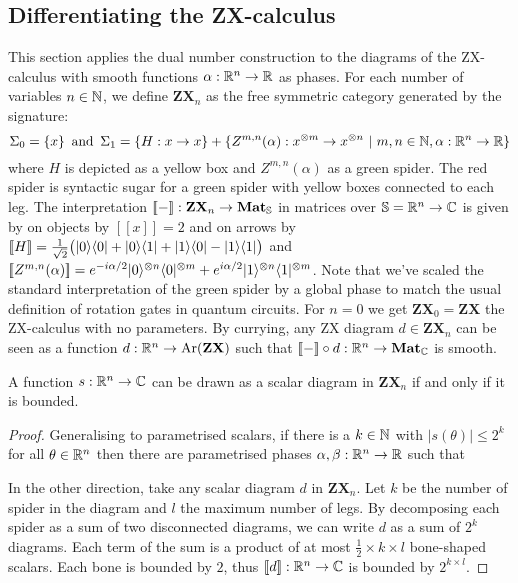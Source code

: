 \subsection{Differentiating the ZX-calculus}\label{2b-differentiating-zx}

This section applies the dual number construction to the diagrams of the ZX-calculus with smooth functions $\alpha : \R^n \to \R$ as phases.
For each number of variables $n \in \N$, we define $\mathbf{ZX}_n$ as the free symmetric category generated by the signature:
$$\Sigma_0 = \{ x \} \s \text{and} \s \Sigma_1 = \{ H : x \to x \} + \{ Z^{m, n}(\alpha) : x^{\otimes m} \to x^{\otimes n} \ \vert \ m, n \in \N, \alpha : \R^n \to \R \}$$
where $H$ is depicted as a yellow box and $Z^{m, n}(\alpha)$ as a green spider.
The red spider is syntactic sugar for a green spider with yellow boxes connected to each leg.
The interpretation $[\![-]\!]  : \mathbf{ZX}_n \to \mathbf{Mat}_\S$ in matrices over $\S = \R^n \to \C$ is given by on objects by $[\![ x ]\!] = 2$ and on arrows by
$[\![ H ]\!] = \frac{1}{\sqrt{2}} \big(\ket{0}\bra{0} + \ket{0}\bra{1} + \ket{1}\bra{0} - \ket{1}\bra{1}\big)$
and $[\![Z^{m, n}(\alpha)]\!] =
e^{-i \alpha / 2} \ket{0}^{\otimes n} \bra{0}^{\otimes m}
+ e^{i \alpha / 2} \ket{1}^{\otimes n} \bra{1}^{\otimes m}$.
Note that we've scaled the standard interpretation of the green spider by a global phase to match the usual definition of rotation gates in quantum circuits.
For $n = 0$ we get $\mathbf{ZX}_0 = \mathbf{ZX}$ the ZX-calculus with no parameters.
By currying, any ZX diagram $d \in \mathbf{ZX}_n$ can be seen as a function $d : \R^n \to \text{Ar}(\mathbf{ZX})$ such that $[\![-]\!] \circ d : \R^n \to \mathbf{Mat}_\C$ is smooth.

\begin{lemma}\label{lemma-scalars}
A function $s : \R^n \to \C$ can be drawn as a scalar diagram in $\mathbf{ZX}_n$ if and only if it is bounded.
\end{lemma}

\begin{proof}
Generalising \cite[P.~8.101]{CoeckeKissinger17} to parametrised scalars, if there is a $k \in \N$ with $\vert s(\theta) \vert \leq 2^k$ for all $\theta \in \R^n$ then there are parametrised phases $\alpha, \beta : \R^n \to \R$ such that


In the other direction, take any scalar diagram $d$ in $\mathbf{ZX}_n$.
Let $k$ be the number of spider in the diagram and $l$ the maximum number
of legs. By decomposing each spider as a sum of two disconnected diagrams,
we can write $d$ as a sum of $2^k$ diagrams. Each term of the sum is a product
of at most $\frac{1}{2} \times k \times l$ bone-shaped scalars. Each bone is
bounded by $2$, thus $[\![d]\!] : \R^n \to \C$ is bounded by $2^{k \times l}$.
\end{proof}

